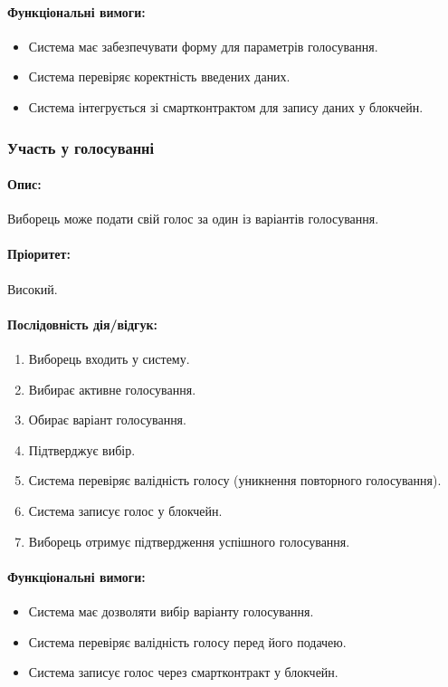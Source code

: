 \documentclass[14pt]{extreport}
\newcounter{req}[subsubsection]
\newcommand\req{\arabic{req}\stepcounter{req}}
\begin{document}
  \paragraph{Функціональні вимоги:}
  \begin{itemize}[leftmargin=*,label=REQ-.\req:]  
      \item Система має забезпечувати форму для параметрів голосування.
      \item Система перевіряє коректність введених даних.
      \item Система інтегрується зі смартконтрактом для запису даних у блокчейн.  
  \end{itemize}

  \subsubsection{Участь у голосуванні}  
  \paragraph{Опис:} Виборець може подати свій голос за один із варіантів голосування.  
  \paragraph{Пріоритет:} Високий.  
  \paragraph{Послідовність дія/відгук:}  
  \begin{enumerate}  
      \item Виборець входить у систему.  
      \item Вибирає активне голосування.  
      \item Обирає варіант голосування.  
      \item Підтверджує вибір.  
      \item Система перевіряє валідність голосу (уникнення повторного голосування).  
      \item Система записує голос у блокчейн.  
      \item Виборець отримує підтвердження успішного голосування.  
  \end{enumerate}  
  \paragraph{Функціональні вимоги:}  
  \begin{itemize}[leftmargin=*,label=REQ-.\req:]  
      \item Система має дозволяти вибір варіанту голосування.  
      \item Система перевіряє валідність голосу перед його подачею.  
      \item Система записує голос через смартконтракт у блокчейн.  
  \end{itemize}  
\end{document}
